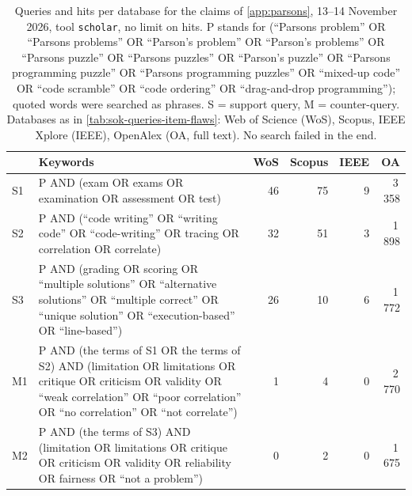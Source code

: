 \begin{table}[htbp]
  \caption{Queries and hits per database for the claims of
    \cref{app:parsons}, 13--14 November 2026, tool \texttt{scholar}, no
    limit on hits.  P stands for (\enquote{Parsons problem} OR
    \enquote{Parsons problems} OR \enquote{Parson's problem} OR
    \enquote{Parson's problems} OR \enquote{Parsons puzzle} OR
    \enquote{Parsons puzzles} OR \enquote{Parson's puzzle} OR
    \enquote{Parsons programming puzzle} OR \enquote{Parsons programming
    puzzles} OR \enquote{mixed-up code} OR \enquote{code scramble} OR
    \enquote{code ordering} OR \enquote{drag-and-drop programming});
    quoted words were searched as phrases.  S = support query,
    M = counter-query.  Databases as in \cref{tab:sok-queries-item-flaws}:
    Web of Science (WoS), Scopus, IEEE Xplore (IEEE), OpenAlex (OA, full
    text).  No search failed in the end.}
  \label{tab:sok-queries-parsons}
  \centering\footnotesize
  \begin{tabularx}{\linewidth}{@{}l>{\raggedright\arraybackslash}X
    rrrr@{}}
    \toprule
       & Keywords & WoS & Scopus & IEEE & OA \\
    \midrule
    S1 & P AND (exam OR exams OR examination OR assessment OR test)
       & 46 & 75 & 9 & 3\,358 \\
    S2 & P AND (\enquote{code writing} OR \enquote{writing code} OR
         \enquote{code-writing} OR tracing OR correlation OR correlate)
       & 32 & 51 & 3 & 1\,898 \\
    S3 & P AND (grading OR scoring OR \enquote{multiple solutions} OR
         \enquote{alternative solutions} OR \enquote{multiple correct} OR
         \enquote{unique solution} OR \enquote{execution-based} OR
         \enquote{line-based})
       & 26 & 10 & 6 & 1\,772 \\
    \midrule
    M1 & P AND (the terms of S1 OR the terms of S2) AND (limitation OR
         limitations OR critique OR criticism OR validity OR \enquote{weak
         correlation} OR \enquote{poor correlation} OR \enquote{no
         correlation} OR \enquote{not correlate})
       & 1 & 4 & 0 & 2\,770 \\
    M2 & P AND (the terms of S3) AND (limitation OR limitations OR
         critique OR criticism OR validity OR reliability OR fairness OR
         \enquote{not a problem})
       & 0 & 2 & 0 & 1\,675 \\
    \bottomrule
  \end{tabularx}
\end{table}

